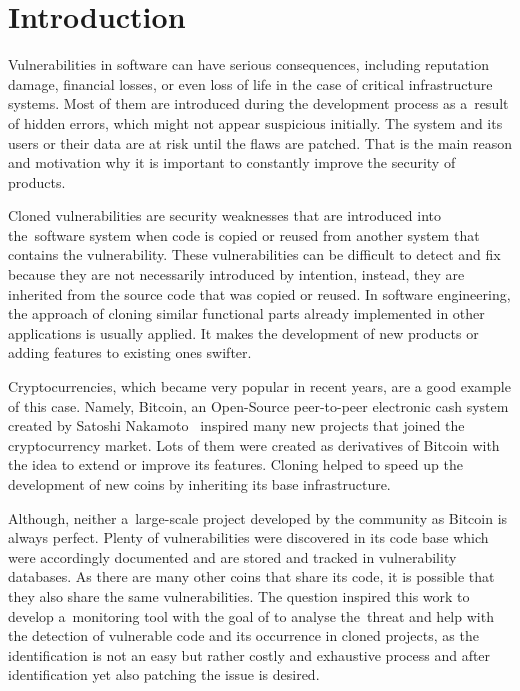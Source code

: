 
\chapter{Introduction}
  Vulnerabilities in software can have serious consequences, including reputation damage,
  financial losses, or even loss of life in the case of critical infrastructure systems. Most of them
  are introduced during the development process as a~result of hidden errors, which might not appear
  suspicious initially. The system and its users or their data are at risk until the flaws are patched.
  That is the main reason and motivation why it is important to constantly improve the security of products.

  Cloned vulnerabilities are security weaknesses that are introduced into the~software system
  when code is copied or reused from another system that contains the vulnerability.
  These vulnerabilities can be difficult to detect and fix because they are not necessarily introduced
  by intention, instead, they are inherited from the source code that was copied or reused. In software
  engineering, the approach of cloning similar functional parts already implemented in other applications
  is usually applied. It makes the development of new products or adding features to existing ones swifter.

  Cryptocurrencies, which became very popular in recent years, are a good example of this case.
  Namely, Bitcoin, an Open-Source peer-to-peer electronic cash system created by Satoshi Nakamoto~\cite{bitcoin}
  inspired many new projects that joined the cryptocurrency market. Lots of them were created
  as derivatives of Bitcoin with the idea to extend or improve its features. Cloning helped to speed up
  the development of new coins by inheriting its base infrastructure.

  Although, neither a~large-scale project developed by the community as Bitcoin is always perfect. Plenty of
  vulnerabilities were discovered in its code base which were accordingly documented and are stored
  and tracked in vulnerability databases. As there are many other coins that share its code, it is possible
  that they also share the same vulnerabilities. The question inspired this work to develop a~monitoring tool
  with the goal of to analyse the~threat and help with the detection of vulnerable code and its occurrence in
  cloned projects, as the identification is not an easy but rather costly and exhaustive process
  and after identification yet also patching the issue is desired.

